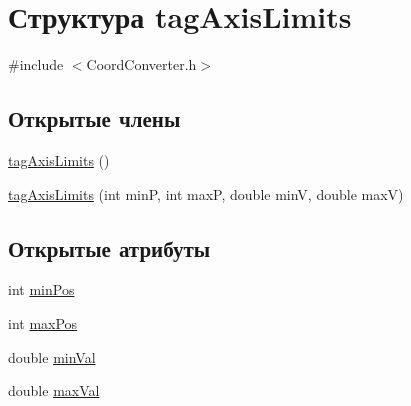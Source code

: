 \hypertarget{structtag_axis_limits}{\section{Структура tag\-Axis\-Limits}
\label{structtag_axis_limits}
}


{\ttfamily \#include $<$Coord\-Converter.\-h$>$}

\subsection*{Открытые члены}
\begin{DoxyCompactItemize}
\item 
\hyperlink{structtag_axis_limits_a0acfd629578c8b0b25f0744599f794c1}{tag\-Axis\-Limits} ()
\item 
\hyperlink{structtag_axis_limits_a7cc7e0d3078ac0323b72508bbc625ba7}{tag\-Axis\-Limits} (int min\-P, int max\-P, double min\-V, double max\-V)
\end{DoxyCompactItemize}
\subsection*{Открытые атрибуты}
\begin{DoxyCompactItemize}
\item 
int \hyperlink{structtag_axis_limits_adb6a574ead738985f922f6b5ad0a18d9}{min\-Pos}
\item 
int \hyperlink{structtag_axis_limits_a278c6398cff218e2b0d361a27cc48d52}{max\-Pos}
\item 
double \hyperlink{structtag_axis_limits_a2ff24b523fb98cbe0a00bde3e0210f7c}{min\-Val}
\item 
double \hyperlink{structtag_axis_limits_ae550302cf4abe7ca5cb3ff6bc311a305}{max\-Val}
\end{DoxyCompactItemize}


